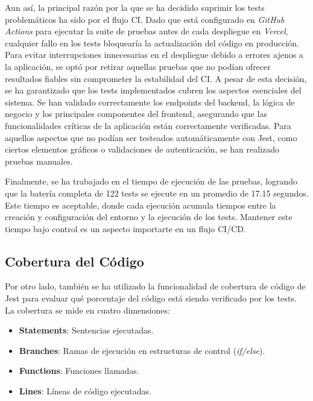 Aun así, la principal razón por la que se ha decidido suprimir los tests problemáticos ha sido por el flujo CI. Dado que está configurado en \textit{GitHub Actions} para ejecutar la suite de pruebas antes de cada despliegue en \textit{Vercel}, cualquier fallo en los tests bloquearía la actualización del código en producción. Para evitar interrupciones innecesarias en el despliegue debido a errores ajenos a la aplicación, se optó por retirar aquellas pruebas que no podían ofrecer resultados fiables sin comprometer la estabilidad del CI. A pesar de esta decisión, se ha garantizado que los tests implementados cubren los aspectos esenciales del sistema. Se han validado correctamente los endpoints del backend, la lógica de negocio y los principales componentes del frontend, asegurando que las funcionalidades críticas de la aplicación están correctamente verificadas. Para aquellos aspectos que no podían ser testeados automáticamente con Jest, como ciertos elementos gráficos o validaciones de autenticación, se han realizado pruebas manuales.

Finalmente, se ha trabajado en el tiempo de ejecución de las pruebas, logrando que la batería completa de 122 tests se ejecute en un promedio de 17.15 segundos. Este tiempo es aceptable, donde cada ejecución acumula tiempos entre la creación y configuración del entorno y la ejecución de los tests. Mantener este tiempo bajo control es un aspecto importarte en un flujo CI/CD.

\subsection{Cobertura del Código}

Por otro lado, también se ha utilizado la funcionalidad de cobertura de código de Jest para evaluar qué porcentaje del código está siendo verificado por los tests. La cobertura se mide en cuatro dimensiones:

\begin{itemize}
    \item \textbf{Statements}: Sentencias ejecutadas. \vspace{-5pt}
    \item \textbf{Branches}: Ramas de ejecución en estructuras de control (\textit{if/else}). \vspace{-5pt}
    \item \textbf{Functions}: Funciones llamadas. \vspace{-5pt}
    \item \textbf{Lines}: Líneas de código ejecutadas.
\end{itemize}

